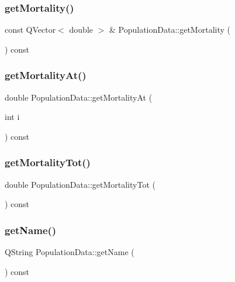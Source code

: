 \subsubsection{\texorpdfstring{getMortality()}{getMortality()}}
{\footnotesize\ttfamily const Q\+Vector$<$ double $>$ \& Population\+Data\+::get\+Mortality (\begin{DoxyParamCaption}{ }\end{DoxyParamCaption}) const}

\mbox{\label{class_population_data_a6134712a38d67bb74fbc3d277a1945ab}} 
\subsubsection{\texorpdfstring{getMortalityAt()}{getMortalityAt()}}
{\footnotesize\ttfamily double Population\+Data\+::get\+Mortality\+At (\begin{DoxyParamCaption}\item[{int}]{i }\end{DoxyParamCaption}) const}

\mbox{\label{class_population_data_a46e481ced689ecba123bbcb52b014b81}} 
\subsubsection{\texorpdfstring{getMortalityTot()}{getMortalityTot()}}
{\footnotesize\ttfamily double Population\+Data\+::get\+Mortality\+Tot (\begin{DoxyParamCaption}{ }\end{DoxyParamCaption}) const}

\mbox{\label{class_population_data_a9e80a36a4d2c64bc3fcd08fae4f88f9e}} 
\subsubsection{\texorpdfstring{getName()}{getName()}}
{\footnotesize\ttfamily Q\+String Population\+Data\+::get\+Name (\begin{DoxyParamCaption}{ }\end{DoxyParamCaption}) const}

